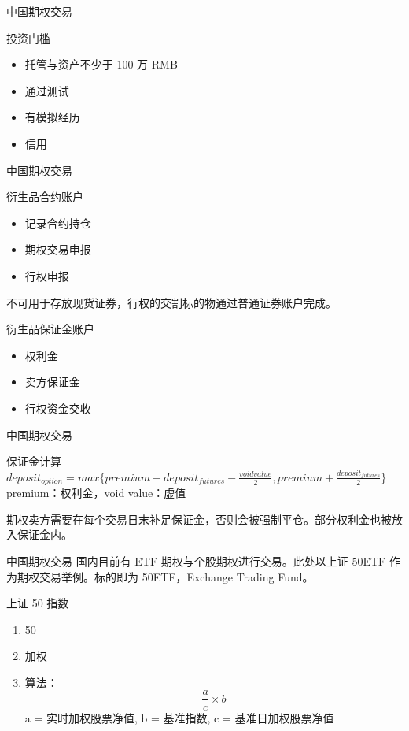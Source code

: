 \documentclass[12pt]{ctexbeamer}	%
\begin{document}
\begin{frame}{中国期权交易}
  \begin{block}{投资门槛}
    \begin{itemize}
      \item 托管与资产不少于 100 万 RMB
      \item 通过测试
      \item 有模拟经历
      \item 信用
    \end{itemize}
  \end{block}
\end{frame}

\begin{frame}{中国期权交易}
  \begin{block}{衍生品合约账户}
    \begin{itemize}
      \item 记录合约持仓
      \item 期权交易申报
      \item 行权申报
    \end{itemize}
    不可用于存放现货证券，行权的交割标的物通过普通证券账户完成。
  \end{block}
  \begin{block}{衍生品保证金账户}
    \begin{itemize}
      \item 权利金
      \item 卖方保证金
      \item 行权资金交收
    \end{itemize}
  \end{block}
\end{frame}

\begin{frame}{中国期权交易}
  \begin{block}{保证金计算}
    \large{$deposit_{option} = max\{ premium + deposit_{futures} - \frac{void value}{2} , premium + \frac{deposit_{futures}}{2} \}$}\\
    premium：权利金，void value：虚值
  \end{block}
  期权卖方需要在每个交易日末补足保证金，否则会被强制平仓。部分权利金也被放入保证金内。
\end{frame}

\begin{frame}{中国期权交易}
  国内目前有 ETF 期权与个股期权进行交易。此处以上证 50ETF 作为期权交易举例。标的即为 50ETF，Exchange Trading Fund。
  \begin{block}{上证 50 指数}
    \begin{enumerate}
      \item 50
      \item 加权
      \item 算法：$$\frac{a}{c} \times b$$a = 实时加权股票净值, b = 基准指数, c = 基准日加权股票净值
    \end{enumerate}
  \end{block}
\end{frame}
\end{document}
